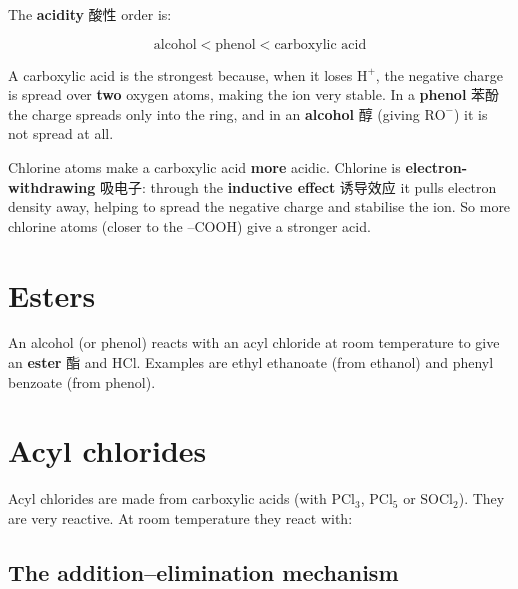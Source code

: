 \documentclass[11pt]{article}
\begin{document}
The \textbf{acidity} 酸性 order is:

\[
\text{alcohol} < \text{phenol} < \text{carboxylic acid}
\]

A carboxylic acid is the strongest because, when it loses $\text{H}^+$, the negative charge is spread over \textbf{two} oxygen atoms, making the ion very stable. In a \textbf{phenol} 苯酚 the charge spreads only into the ring, and in an \textbf{alcohol} 醇 (giving $\text{RO}^-$) it is not spread at all.

Chlorine atoms make a carboxylic acid \textbf{more} acidic. Chlorine is \textbf{electron-withdrawing} 吸电子: through the \textbf{inductive effect} 诱导效应 it pulls electron density away, helping to spread the negative charge and stabilise the ion. So more chlorine atoms (closer to the $\text{–COOH}$) give a stronger acid.

\section*{Esters}

An alcohol (or phenol) reacts with an acyl chloride at room temperature to give an \textbf{ester} 酯 and $\text{HCl}$. Examples are ethyl ethanoate (from ethanol) and phenyl benzoate (from phenol).

\section*{Acyl chlorides}

Acyl chlorides are made from carboxylic acids (with $\text{PCl}_3$, $\text{PCl}_5$ or $\text{SOCl}_2$). They are very reactive. At room temperature they react with:

\begin{center}
\end{center}

\subsection*{The addition–elimination mechanism}
\end{document}
